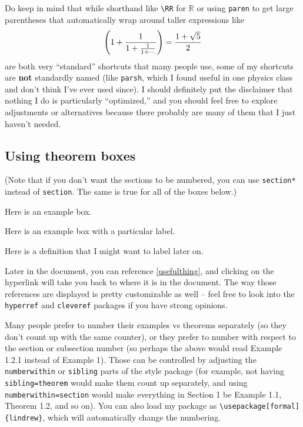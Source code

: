 \documentclass[11pt]{article}
\begin{document}
\begin{remark*}
Do keep in mind that while shorthand like \texttt{\textbackslash RR} for $\mathbb{R}$ or using \texttt{paren} to get large parentheses that automatically wrap around taller expressions like
\[
    \left(1 + \frac{1}{1 + \frac{1}{1 + \cdots}}\right) = \frac{1 + \sqrt{5}}{2}
\]
are both very ``standard'' shortcuts that many people use, some of my shortcuts are \textbf{not} standardly named (like \texttt{parsh}, which I found useful in one physics class and don't think I've ever used since). I should definitely put the disclaimer that nothing I do is particularly ``optimized,'' and you should feel free to explore adjustments or alternatives because there probably are many of them that I just haven't needed.
\end{remark*}

\subsection{Using theorem boxes}

(Note that if you don't want the sections to be numbered, you can use \texttt{section*} instead of \texttt{section}. The same is true for all of the boxes below.)

\begin{example}
Here is an example box.
\end{example}

\begin{theorem}
Here is an example box with a particular label.
\end{theorem}

\begin{definition}\label{usefulthing}
Here is a definition that I might want to label later on.
\end{definition}

Later in the document, you can reference \cref{usefulthing}, and clicking on the hyperlink will take you back to where it is in the document. The way those references are displayed is pretty customizable as well -- feel free to look into the \texttt{hyperref} and \texttt{cleveref} packages if you have strong opinions.

Many people prefer to number their examples vs theorems separately (so they don't count up with the same counter), or they prefer to number with respect to the section or subsection number (so perhaps the above would read Example 1.2.1 instead of Example 1). Those can be controlled by adjusting the \texttt{numberwithin} or \texttt{sibling} parts of the style package (for example, not having \texttt{sibling=theorem} would make them count up separately, and using \texttt{numberwithin=section} would make everything in Section 1 be Example 1.1, Theorem 1.2, and so on). You can also load my package as \texttt{\textbackslash usepackage[formal]\{lindrew\}}, which will automatically change the numbering.
\end{document}
